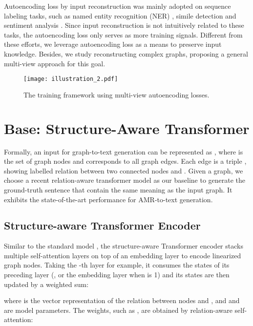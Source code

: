\documentclass[11pt,a4paper]{article}
\begin{document}
Autoencoding loss by input reconstruction was mainly adopted on sequence labeling tasks, such as named entity recognition (NER) \citep{rei2017semi,liu2018empower,jia2019cross}, simile detection \citep{liu2018neural} and sentiment analysis \citep{rei2019jointly}.
Since input reconstruction is not intuitively related to these tasks, the autoencoding loss only serves as more training signals.
Different from these efforts, we leverage autoencoding loss as a means to preserve input knowledge.
Besides, we study reconstructing complex graphs, proposing a general multi-view approach for this goal.





\begin{figure*}
    \centering
    \texttt{[image: illustration\_2.pdf]}
    \caption{The training framework using multi-view autoencoding losses.}
    \label{fig:model}
\end{figure*}


\section{Base: Structure-Aware Transformer}
\label{sec:baseline}


Formally, an input for graph-to-text generation can be represented as , where  is the set of graph nodes and  corresponds to all graph edges.
Each edge  is a triple , showing labelled relation between two connected nodes  and .
Given a graph, we choose a recent relation-aware transformer model \citep{zhu2019modeling} as our baseline to generate the ground-truth sentence  that contain the same meaning as the input graph.
It exhibits the state-of-the-art performance for AMR-to-text generation.


\subsection{Structure-aware Transformer Encoder}


Similar to the standard model
\citep{vaswani2017attention}, the structure-aware Transformer encoder stacks multiple self-attention layers on top of an embedding layer to encode linearized graph nodes.
Taking the -th layer for example, it consumes the states of its preceding layer (, or the embedding layer when  is 1) and its states are then updated by a weighted sum:

where  is the vector representation of the relation between nodes  and , and  and  are model parameters.
The weights, such as , are obtained by relation-aware self-attention:
\end{document}
